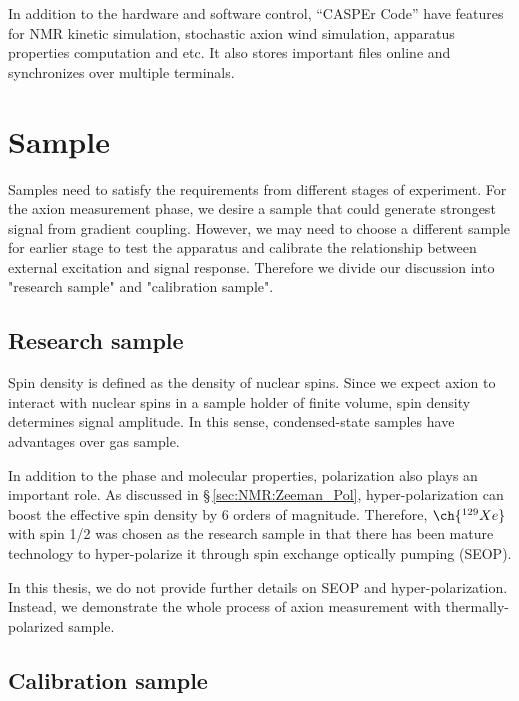 In addition to the hardware and software control, ``CASPEr Code'' have features for NMR kinetic simulation, stochastic axion wind simulation, apparatus properties computation and etc. It also stores important files online and synchronizes over multiple terminals. 

\section{Sample}

Samples need to satisfy the requirements from different stages of experiment. For the axion measurement phase, we desire a sample that could generate strongest signal from gradient coupling. However, we may need to choose a different sample for earlier stage to test the apparatus and calibrate the relationship between external excitation and signal response. Therefore we divide our discussion into "research sample" and "calibration sample". 

\subsection{Research sample}

Spin density is defined as the density of nuclear spins. Since we expect axion to interact with nuclear spins in a sample holder of finite volume, spin density determines signal amplitude. In this sense, condensed-state samples have advantages over gas sample. 

In addition to the phase and molecular properties, polarization also plays an important role. 
As discussed in \S\,\ref{sec:NMR:Zeeman_Pol}, hyper-polarization can boost the effective spin density by 6 orders of magnitude. Therefore, $\ch{^{129}Xe}$ with spin 1/2 was chosen as the research sample in that there has been mature technology to hyper-polarize it through spin exchange optically pumping (SEOP). 

In this thesis, we do not provide further details on SEOP and hyper-polarization. Instead, we demonstrate the whole process of axion measurement with thermally-polarized sample. 

\subsection{Calibration sample}


